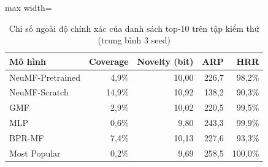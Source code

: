\begin{table}[htbp]
    \centering\small
    \caption{Chỉ số ngoài độ chính xác của danh sách top-10 trên tập kiểm thử (trung bình 3 seed)}
    \label{tab:beyond}
    \begin{adjustbox}{max width=\textwidth}
    \begin{tabular}{lrrrr}
        \toprule
        Mô hình & Coverage & Novelty (bit) & ARP & HRR \\
        \midrule
        NeuMF-Pretrained & 4{,}9\% & 10{,}00 & 226{,}7 & 98{,}2\% \\
        NeuMF-Scratch & 14{,}9\% & 10{,}92 & 138{,}2 & 90{,}3\% \\
        GMF & 2{,}9\% & 10{,}02 & 220{,}5 & 99{,}5\% \\
        MLP & 0{,}6\% & 9{,}80 & 243{,}3 & 99{,}9\% \\
        BPR-MF & 7{,}4\% & 10{,}13 & 227{,}6 & 93{,}3\% \\
        Most Popular & 0{,}2\% & 9{,}69 & 258{,}5 & 100{,}0\% \\
        \bottomrule
    \end{tabular}
    \end{adjustbox}
    \par{}
\end{table}
